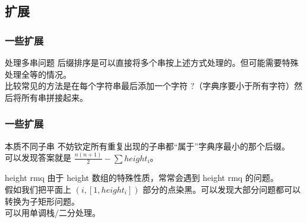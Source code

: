 \documentclass[UTF8]{beamer}
\begin{document}
\begin{CJK}{UTF8}{song}
\subsection{扩展}
\begin{frame}
	\frametitle{一些扩展}
	\pause
	\begin{block}{处理多串问题}
		后缀排序是可以直接将多个串按上述方式处理的。但可能需要特殊处理全等的情况。\\
		比较常见的方法是在每个字符串最后添加一个字符 $?$（字典序要小于所有字符）然后将所有串拼接起来。
	\end{block}
\end{frame}
\begin{frame}
	\frametitle{一些扩展}
	\begin{block}{本质不同子串}
		不妨钦定所有重复出现的子串都“属于”字典序最小的那个后缀。\\
		可以发现答案就是 $\frac{n(n+1)} 2-\sum{height_i}$。
	\end{block}
	\pause
	\begin{block}{height rmq}
		由于 height 数组的特殊性质，常常会遇到 height rmq 的问题。\\
		假如我们把平面上 $(i,[1,height_i])$ 部分的点染黑。可以发现大部分问题都可以转换为子矩形问题。\\
		可以用单调栈/二分处理。
	\end{block}
\end{frame}

\end{CJK}
\end{document}
